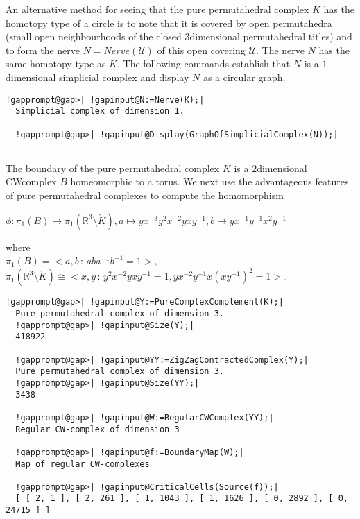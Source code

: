 \documentclass[a4paper,11pt]{report}
\begin{document}
{{An alternative method for seeing that the pure permutahedral complex $K$ has the homotopy type of a circle is to note that it is covered by open
permutahedra (small open neighbourhoods of the closed $3$\texttt{}dimensional permutahedral titles) and to form the nerve $N=Nerve({\mathcal U})$ of this open covering $\mathcal U$. The nerve $N$ has the same homotopy type as $K$. The following commands establish that $N$ is a $1$\texttt{}dimensional simplicial complex and display $N$ as a circular graph. 
\begin{Verbatim}[commandchars=!@|,fontsize=\small,frame=single,label=Example]
  !gapprompt@gap>| !gapinput@N:=Nerve(K);|
  Simplicial complex of dimension 1.
  
  !gapprompt@gap>| !gapinput@Display(GraphOfSimplicialComplex(N));|
  
\end{Verbatim}
  

 The boundary of the pure permutahedral complex $K$ is a $2$\texttt{}dimensional CW\texttt{}complex $B$ homeomorphic to a torus. We next use the advantageous features of pure
permutahedral complexes to compute the homomorphism 

$\phi\colon \pi_1(B) \rightarrow \pi_1(\mathbb R^3\setminus \mathring{K}), a
\mapsto yx^{-3}y^2x^{-2}yxy^{-1}, b\mapsto yx^{-1}y^{-1}x^2y^{-1}$ 

where\\
 $\pi_1(B)=< a,b\, :\, aba^{-1}b^{-1}=1>$,\\
 $\pi_1(\mathbb R^3\setminus \mathring{K}) \cong < x,y\, :\,
y^2x^{-2}yxy^{-1}=1, yx^{-2}y^{-1}x(xy^{-1})^2=1>$. 
\begin{Verbatim}[commandchars=!@|,fontsize=\small,frame=single,label=Example]
  !gapprompt@gap>| !gapinput@Y:=PureComplexComplement(K);|
  Pure permutahedral complex of dimension 3.
  !gapprompt@gap>| !gapinput@Size(Y);|
  418922
  
  !gapprompt@gap>| !gapinput@YY:=ZigZagContractedComplex(Y);|
  Pure permutahedral complex of dimension 3.
  !gapprompt@gap>| !gapinput@Size(YY);|
  3438
  
  !gapprompt@gap>| !gapinput@W:=RegularCWComplex(YY);|
  Regular CW-complex of dimension 3
  
  !gapprompt@gap>| !gapinput@f:=BoundaryMap(W);|
  Map of regular CW-complexes
  
  !gapprompt@gap>| !gapinput@CriticalCells(Source(f));|
  [ [ 2, 1 ], [ 2, 261 ], [ 1, 1043 ], [ 1, 1626 ], [ 0, 2892 ], [ 0, 24715 ] ]
  

\end{Verbatim}}}
\end{document}
